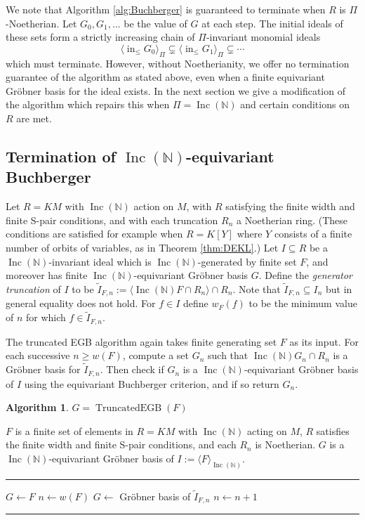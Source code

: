 \documentclass{article}
\theoremstyle{plain}
\theoremstyle{definition}
\newtheorem{algorithm}[theorem]{Algorithm}
\numberwithin{equation}{section}
\newcommand{\B}[1]{\mathbb #1}
\newcommand{\alg}[1]{\operatorname{#1}}
\newcommand{\ideal}[1]{\langle #1 \rangle}
\DeclareMathOperator{\initial}{in}
\newcommand{\Inc}{\operatorname{Inc}(\B N)}
\newcommand{\mon}{M}
\newcommand{\LT}{\initial_{\leq}}
\begin{document}
We note that Algorithm \ref{alg:Buchberger} is guaranteed to terminate when $R$ is $\Pi$-Noetherian.  Let $G_0,G_1,\ldots$ be the value of $G$ at each step.  The initial ideals of these sets form a strictly increasing chain of $\Pi$-invariant monomial ideals
 \[ \ideal{\LT G_0}_\Pi \subsetneq \ideal{\LT G_1}_\Pi \subsetneq \cdots \]
which must terminate.  However, without Noetherianity, we offer no termination guarantee of the algorithm as stated above, even when a finite equivariant Gr\"obner basis for the ideal exists.  In the next section we give a modification of the algorithm which repairs this when $\Pi = \Inc$ and certain conditions on $R$ are met.

\subsection{Termination of $\Inc$-equivariant Buchberger}
Let $R = K\mon$ with $\Inc$ action on $\mon$, with $R$ satisfying the finite width and finite S-pair conditions, and with each truncation $R_n$ a Noetherian ring.  (These conditions are satisfied for example when $R = K[Y]$ where $Y$ consists of a finite number of orbits of variables, as in Theorem \ref{thm:DEKL}.)   Let $I \subseteq R$ be a $\Inc$-invariant ideal which is $\Inc$-generated by finite set $F$, and moreover has finite $\Inc$-equivariant Gr\"obner basis $G$.  Define the {\em generator truncation} of $I$ to be $\tilde{I}_{F,n} := \ideal{\Inc F \cap R_n} \cap R_n$.  Note that $\tilde{I}_{F,n} \subseteq I_n$ but in general equality does not hold.  For $f \in I$ define $w_F(f)$ to be the minimum value of $n$ for which $f \in \tilde{I}_{F,n}$.

The truncated EGB algorithm again takes finite generating set $F$ as its input.  For each successive $n \geq w(F)$, compute a set $G_n$ such that $\Inc G_n \cap R_n$ is a Gr\"obner basis for $\tilde{I}_{F,n}$.  Then check if $G_n$ is a $\Inc$-equivariant Gr\"obner basis of $I$ using the equivariant Buchberger criterion, and if so return $G_n$.

\begin{algorithm}\label{alg:truncBuch}
$G = \alg{TruncatedEGB}(F)$
\begin{algorithmic}[1]
\REQUIRE $F$ is a finite set of elements in $R = K\mon$ with $\Inc$ acting on $\mon$, $R$ satisfies the finite width and finite S-pair conditions, and each $R_n$ is Noetherian.
\ENSURE $G$ is a $\Inc$-equivariant Gr\"obner basis of $I := \ideal{F}_{\Inc}$.

\smallskip \hrule \smallskip

\STATE $G\gets F$
\STATE $n\gets w(F)$
\WHILE{$G$ not a $\Inc$-equivariant Gr\"obner basis of $I$}
	\STATE $G\gets$ Gr\"obner basis of $\tilde{I}_{F,n}$
	\STATE $n \gets n+1$
\ENDWHILE
\smallskip \hrule \smallskip
\end{algorithmic}
\end{algorithm}
\end{document}
